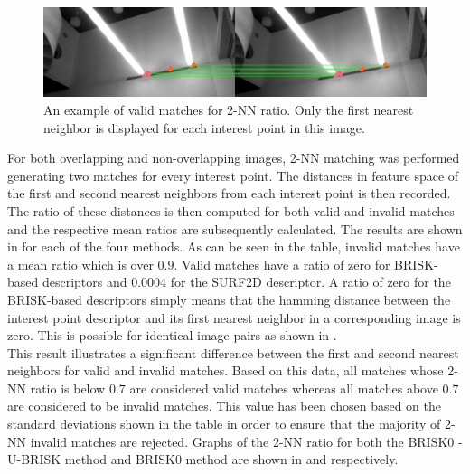  \begin{figure}%
  \centering
    \includegraphics[width=1.0\textwidth]{../Drawings/knnRatio/KNN_ratio.jpg}
    \caption{An example of valid matches for 2-NN ratio. Only the first nearest neighbor is displayed for each interest point in this image.} 
    \label{fig:validKnn}
 \end{figure}

For both overlapping and non-overlapping images, 2-NN matching was performed generating two matches for every interest point. The distances in feature space of the first and second nearest neighbors from each interest point is then recorded. The ratio of these distances is then computed for both valid and invalid matches and the respective mean ratios are subsequently calculated. The results are shown in  for each of the four methods. As can be seen in the table, invalid matches have a mean ratio which is over $0.9$. Valid matches have a ratio of zero for BRISK-based descriptors and $0.0004$ for the SURF2D descriptor. A ratio of zero for the BRISK-based descriptors simply means that the hamming distance between the interest point descriptor and its first nearest neighbor in a corresponding image is zero. This is possible for identical image pairs as shown in .\\ 

This result illustrates a significant difference between the first and second nearest neighbors for valid and invalid matches. Based on this data, all matches whose 2-NN ratio is below $0.7$ are considered valid matches whereas all matches above $0.7$ are considered to be invalid matches. This value has been chosen based on the standard deviations shown in the table in order to ensure that the majority of 2-NN invalid matches are rejected. Graphs of the 2-NN ratio for both the BRISK0 - U-BRISK method and BRISK0 method are shown in  and  respectively. \\

